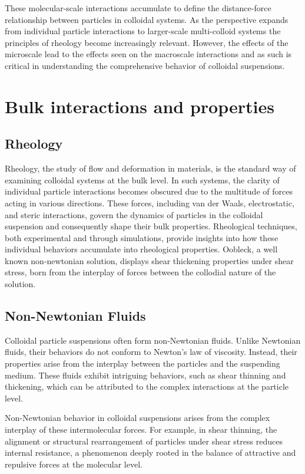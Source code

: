 These molecular-scale interactions accumulate to define the distance-force relationship between particles in colloidal systems. As the perspective expands from individual particle interactions to larger-scale multi-colloid systems the principles of rheology become increasingly relevant. However, the effects of the microscale lead to the effects seen on the macroscale interactions and as such is critical in understanding the comprehensive behavior of colloidal suspensions. \cite{C0SM00444H}



\section{Bulk interactions and properties}

\subsection{Rheology}
Rheology, the study of flow and deformation in materials, is the standard way of examining colloidal systems at the bulk level. In such systems, the clarity of individual particle interactions becomes obscured due to the multitude of forces acting in various directions. These forces, including van der Waals, electrostatic, and steric interactions, govern the dynamics of particles in the colloidal suspension and consequently shape their bulk properties. Rheological techniques, both experimental and through simulations, provide insights into how these individual behaviors accumulate into rheological properties. Oobleck, a well known non-newtonian solution, displays shear thickening properties under shear stress, born from the interplay of forces between the collodial nature of the solution.

\subsection{Non-Newtonian Fluids}
Colloidal particle suspensions often form non-Newtonian fluids. Unlike Newtonian fluids, their behaviors do not conform to Newton's law of viscosity. Instead, their properties arise from the interplay between the particles and the suspending medium. These fluids exhibit intriguing behaviors, such as shear thinning and thickening, which can be attributed to the complex interactions at the particle level.\cite{Rheo2}

Non-Newtonian behavior in colloidal suspensions arises from the complex interplay of these intermolecular forces. For example, in shear thinning, the alignment or structural rearrangement of particles under shear stress reduces internal resistance, a phenomenon deeply rooted in the balance of attractive and repulsive forces at the molecular level.\cite{Rheo2}

